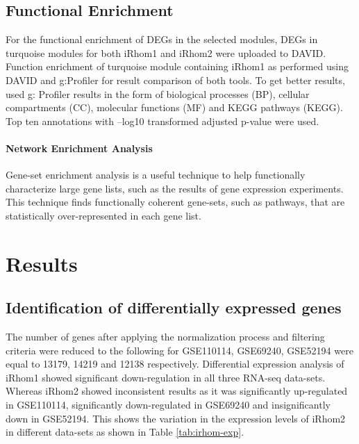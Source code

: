 \documentclass[fleqn,10pt,lineno]{wlpeerj}
\begin{document}
\subsection*{Functional Enrichment}
For the functional enrichment of DEGs in the selected modules, DEGs in turquoise modules for both iRhom1 and iRhom2 were uploaded to DAVID. Function enrichment of turquoise module containing iRhom1 as performed using DAVID and g:Profiler for result comparison of both tools. To get better results, used g: Profiler results in the form of biological processes (BP), cellular compartments (CC), molecular functions (MF) and KEGG pathways (KEGG). Top ten annotations with –log10 transformed adjusted p-value were used.

\paragraph{Network Enrichment Analysis}
Gene-set enrichment analysis is a useful technique to help functionally characterize large gene lists, such as the results of gene expression experiments. This technique finds functionally coherent gene-sets, such as pathways, that are statistically over-represented in each gene list. 

\section*{Results}
\subsection*{Identification of differentially expressed genes}
The number of genes after applying the normalization process and filtering criteria were reduced to the following for GSE110114, GSE69240, GSE52194 were equal to 13179, 14219 and 12138 respectively. Differential expression analysis of iRhom1 showed significant down-regulation in all three RNA-seq data-sets. Whereas iRhom2 showed inconsistent results as it was significantly up-regulated in GSE110114, significantly down-regulated in GSE69240 and insignificantly down in GSE52194. This shows the variation in the expression levels of iRhom2 in different data-sets as shown in Table \ref{tab:irhom-exp}. 
\end{document}
